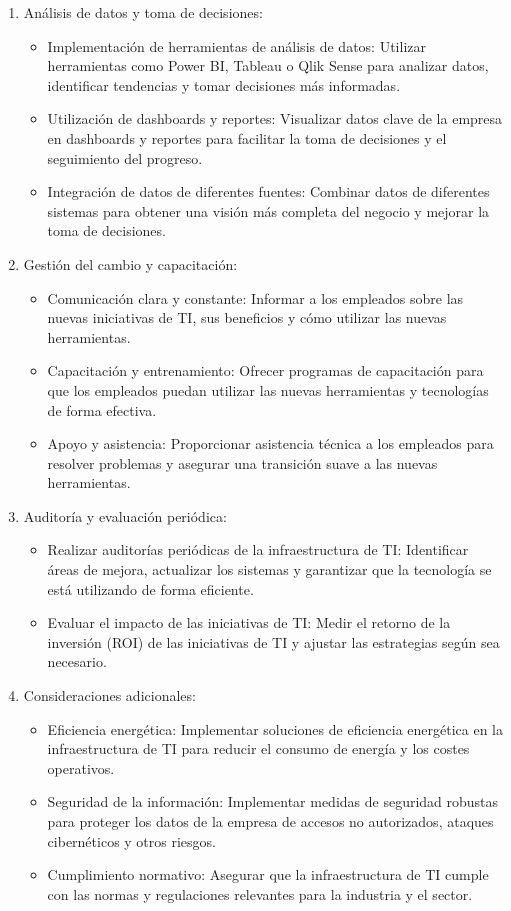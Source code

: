 \documentclass{article}
\begin{document}
\begin{enumerate}
\begin{itemize}
  \end{itemize}
  \item Análisis de datos y toma de decisiones:
  \begin{itemize}
    \item Implementación de herramientas de análisis de datos: Utilizar herramientas como Power BI, Tableau o Qlik Sense para analizar datos, identificar tendencias y tomar decisiones más informadas.
    \item Utilización de dashboards y reportes: Visualizar datos clave de la empresa en dashboards y reportes para facilitar la toma de decisiones y el seguimiento del progreso.
    \item Integración de datos de diferentes fuentes: Combinar datos de diferentes sistemas para obtener una visión más completa del negocio y mejorar la toma de decisiones.
  \end{itemize}
  \item Gestión del cambio y capacitación:
  \begin{itemize}
    \item Comunicación clara y constante: Informar a los empleados sobre las nuevas iniciativas de TI, sus beneficios y cómo utilizar las nuevas herramientas.
    \item Capacitación y entrenamiento: Ofrecer programas de capacitación para que los empleados puedan utilizar las nuevas herramientas y tecnologías de forma efectiva.
    \item Apoyo y asistencia: Proporcionar asistencia técnica a los empleados para resolver problemas y asegurar una transición suave a las nuevas herramientas.
  \end{itemize}
  \item Auditoría y evaluación periódica:
  \begin{itemize}
    \item Realizar auditorías periódicas de la infraestructura de TI: Identificar áreas de mejora, actualizar los sistemas y garantizar que la tecnología se está utilizando de forma eficiente.
    \item Evaluar el impacto de las iniciativas de TI: Medir el retorno de la inversión (ROI) de las iniciativas de TI y ajustar las estrategias según sea necesario.
  \end{itemize}
  \item Consideraciones adicionales:
  \begin{itemize}
    \item Eficiencia energética: Implementar soluciones de eficiencia energética en la infraestructura de TI para reducir el consumo de energía y los costes operativos.
    \item Seguridad de la información: Implementar medidas de seguridad robustas para proteger los datos de la empresa de accesos no autorizados, ataques cibernéticos y otros riesgos.
    \item Cumplimiento normativo: Asegurar que la infraestructura de TI cumple con las normas y regulaciones relevantes para la industria y el sector.
  \end{itemize}
\end{enumerate}
\end{document}

